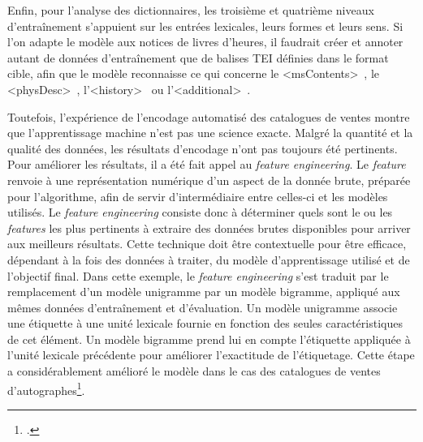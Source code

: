 \documentclass[a4paper,12pt,twoside]{book}
\begin{document}
Enfin, pour l'analyse des dictionnaires, les troisième et quatrième niveaux d'entraînement s'appuient sur les entrées lexicales, leurs formes et leurs sens. Si l'on adapte le modèle aux notices de livres d'heures, il faudrait créer et annoter autant de données d'entraînement que de balises TEI définies dans le format cible, afin que le modèle reconnaisse ce qui concerne le \textless msContents\textgreater~, le \textless physDesc\textgreater~, l'\textless history\textgreater~ ou l'\textless additional\textgreater~.
	
	Toutefois, l'expérience de l'encodage automatisé des catalogues de ventes montre que l'apprentissage machine n'est pas une science exacte. Malgré la quantité et la qualité des données, les résultats d'encodage n'ont pas toujours été pertinents. Pour améliorer les résultats, il a été fait appel au \textit{feature engineering}. Le \textit{feature} renvoie à une représentation numérique d'un aspect de la donnée brute, préparée pour l'algorithme, afin de servir d'intermédiaire entre celles-ci et les modèles utilisés. Le \textit{feature engineering} consiste donc à déterminer quels sont le ou les \textit{features} les plus pertinents à extraire des données brutes disponibles pour arriver aux meilleurs résultats. Cette technique doit être contextuelle pour être efficace, dépendant à la fois des données à traiter, du modèle d'apprentissage utilisé et de l'objectif final. Dans cette exemple, le \textit{feature engineering} s'est traduit par le remplacement d’un modèle unigramme par un modèle bigramme, appliqué aux mêmes données d’entraînement et d’évaluation. Un modèle unigramme associe une étiquette à une unité lexicale fournie en fonction des seules caractéristiques de cet élément. Un modèle bigramme prend lui en compte l’étiquette appliquée à l'unité lexicale précédente pour améliorer l’exactitude de l’étiquetage. Cette étape a considérablement amélioré le modèle dans le cas des catalogues de ventes d'autographes\footcite[p. 42-44]{encoder_auto_catalogue}. \\
	
\end{document}
